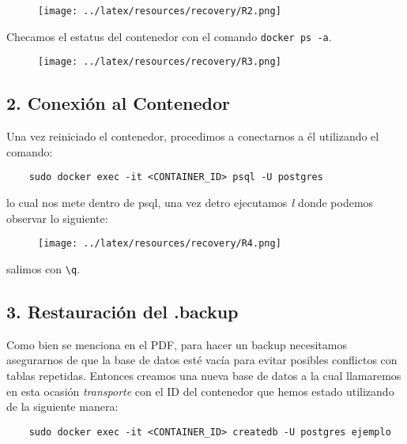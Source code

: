\begin{figure}[H]
    \centering
        \texttt{[image: ../latex/resources/recovery/R2.png]}
    \end{figure}

Checamos el estatus del contenedor con el comando \texttt{docker ps -a}. \vspace{0.3cm}

\begin{figure}[H]
    \centering
        \texttt{[image: ../latex/resources/recovery/R3.png]}
    \end{figure}

\subsection*{2. Conexión al Contenedor}

Una vez reiniciado el contenedor, procedimos a conectarnos a él utilizando el comando: \vspace{0.3cm}

\begin{verbatim}
    sudo docker exec -it <CONTAINER_ID> psql -U postgres
\end{verbatim}

lo cual nos mete dentro de psql, una vez detro ejecutamos \textit{\l} donde podemos observar lo siguiente: \vspace{0.3cm}

\begin{figure}[H]
    \centering
        \texttt{[image: ../latex/resources/recovery/R4.png]}
\end{figure}

salimos con \texttt{\textbackslash q}.

\subsection*{3. Restauración del .backup}

Como bien se menciona en el PDF, para hacer un backup necesitamos asegurarnos de que la base de datos esté vacía para evitar posibles conflictos con tablas repetidas. Entonces creamos una nueva base de datos a la cual llamaremos en esta ocasión \textit{transporte} con el ID del contenedor que hemos estado utilizando de la siguiente manera: \vspace{0.3cm}

\begin{verbatim}
    sudo docker exec -it <CONTAINER_ID> createdb -U postgres ejemplo
\end{verbatim}

